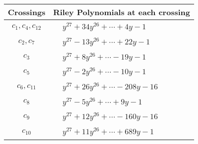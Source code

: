 \documentclass[1p]{elsarticle_modified}
\theoremstyle{definition}
\begin{document}
\begin{tabular}{m{50pt}|m{274pt}}
Crossings & \hspace{64pt}Riley Polynomials at each crossing \\
\hline $$\begin{aligned}c_{1},c_{4},c_{12}\end{aligned}$$&$\begin{aligned}
&y^{27}+34 y^{26}+\cdots+4 y-1
\end{aligned}$\\
\hline $$\begin{aligned}c_{2},c_{7}\end{aligned}$$&$\begin{aligned}
&y^{27}-13 y^{26}+\cdots+22 y-1
\end{aligned}$\\
\hline $$\begin{aligned}c_{3}\end{aligned}$$&$\begin{aligned}
&y^{27}+8 y^{26}+\cdots-19 y-1
\end{aligned}$\\
\hline $$\begin{aligned}c_{5}\end{aligned}$$&$\begin{aligned}
&y^{27}-2 y^{26}+\cdots-10 y-1
\end{aligned}$\\
\hline $$\begin{aligned}c_{6},c_{11}\end{aligned}$$&$\begin{aligned}
&y^{27}+26 y^{26}+\cdots-208 y-16
\end{aligned}$\\
\hline $$\begin{aligned}c_{8}\end{aligned}$$&$\begin{aligned}
&y^{27}-5 y^{26}+\cdots+9 y-1
\end{aligned}$\\
\hline $$\begin{aligned}c_{9}\end{aligned}$$&$\begin{aligned}
&y^{27}+12 y^{26}+\cdots-160 y-16
\end{aligned}$\\
\hline $$\begin{aligned}c_{10}\end{aligned}$$&$\begin{aligned}
&y^{27}+11 y^{26}+\cdots+689 y-1
\end{aligned}$\\
\hline
\end{tabular}\\~\\
\end{document}

